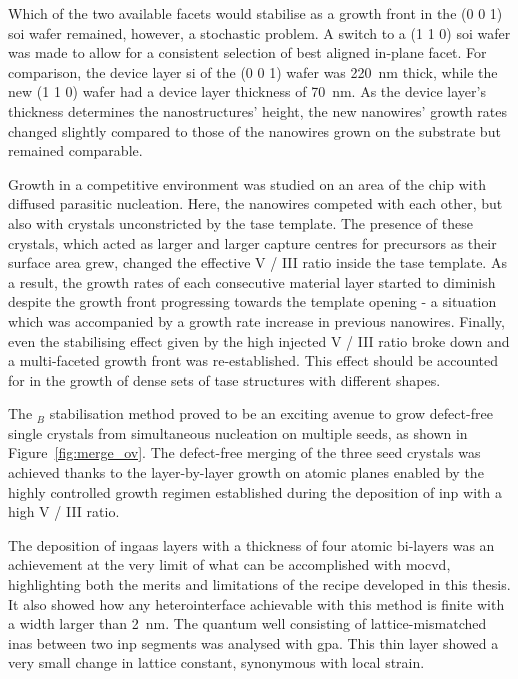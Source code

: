 Which of the two available  facets would stabilise as a growth front in the \hkl(0 0 1) \acf{soi} wafer remained, however, a stochastic problem. A switch to a \hkl(1 1 0) \acs{soi} wafer was made to allow for a consistent selection of best aligned  in-plane facet. For comparison, the device layer \acl{si} of the \hkl(0 0 1) wafer was \qty{220}{\nano\metre} thick, while the new \hkl(1 1 0) wafer had a device layer thickness of \qty{70}{\nano\metre}. As the device layer's thickness determines the nanostructures' height, the new nanowires' growth rates changed slightly compared to those of the nanowires grown on the  substrate but remained comparable.

Growth in a competitive environment was studied on an area of the chip with diffused parasitic nucleation. Here, the nanowires competed with each other, but also with crystals unconstricted by the \acs{tase} template. The presence of these crystals, which acted as larger and larger capture centres for precursors as their surface area grew, changed the effective V / III ratio inside the \acs{tase} template. As a result, the growth rates of each consecutive material layer started to diminish despite the growth front progressing towards the template opening - a situation which was accompanied by a growth rate increase in previous nanowires. Finally, even the stabilising effect given by the high injected V / III ratio broke down and a multi-faceted growth front was re-established. This effect should be accounted for in the growth of dense sets of \acs{tase} structures with different shapes.

The \(_B\) stabilisation method proved to be an exciting avenue to grow defect-free single crystals from simultaneous nucleation on multiple seeds, as shown in Figure~\ref{fig:merge_ov}. The defect-free merging of the three seed crystals was achieved thanks to the layer-by-layer growth on  atomic planes enabled by the highly controlled growth regimen established during the deposition of \acs{inp} with a high V / III ratio.

The deposition of \acs{ingaas} layers with a thickness of four atomic bi-layers was an achievement at the very limit of what can be accomplished with \acf{mocvd}, highlighting both the merits and limitations of the recipe developed in this thesis. It also showed how any heterointerface achievable with this method is finite with a width larger than \qty{2}{\nano\metre}. The quantum well consisting of lattice-mismatched \acf{inas} between two \acs{inp} segments was analysed with \acf{gpa}. This thin layer showed a very small change in lattice constant, synonymous with local strain.

